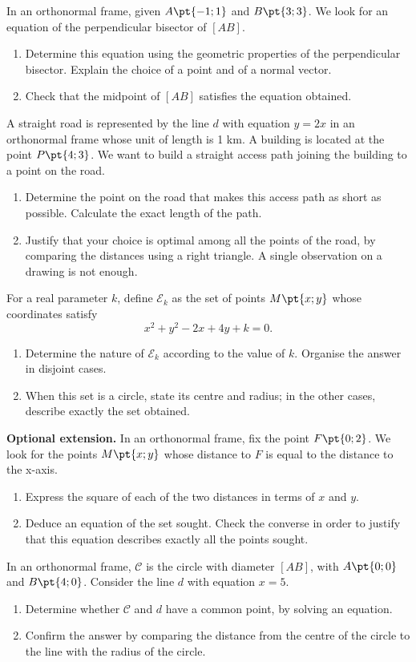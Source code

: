 In an orthonormal frame, given $A\pt{-1;1}$ and $B\pt{3;3}$. We look for an equation of the perpendicular bisector of $[AB]$.
\begin{enumerate}[label=\arabic*.]
\item Determine this equation using the geometric properties of the perpendicular bisector. Explain the choice of a point and of a normal vector.
\item Check that the midpoint of $[AB]$ satisfies the equation obtained.
\end{enumerate}
A straight road is represented by the line $d$ with equation $y=2x$ in an orthonormal frame whose unit of length is 1 km. A building is located at the point $P\pt{4;3}$. We want to build a straight access path joining the building to a point on the road.
\begin{enumerate}[label=\arabic*.]
\item Determine the point on the road that makes this access path as short as possible. Calculate the exact length of the path.
\item Justify that your choice is optimal among all the points of the road, by comparing the distances using a right triangle. A single observation on a drawing is not enough.
\end{enumerate}
For a real parameter $k$, define $\mathcal E_k$ as the set of points $M\pt{x;y}$ whose coordinates satisfy\[x^2+y^2-2x+4y+k=0.\]
\begin{enumerate}[label=\arabic*.]
\item Determine the nature of $\mathcal E_k$ according to the value of $k$. Organise the answer in disjoint cases.
\item When this set is a circle, state its centre and radius; in the other cases, describe exactly the set obtained.
\end{enumerate}
\textbf{Optional extension.} In an orthonormal frame, fix the point $F\pt{0;2}$. We look for the points $M\pt{x;y}$ whose distance to $F$ is equal to the distance to the x-axis.
\begin{enumerate}[label=\arabic*.]
\item Express the square of each of the two distances in terms of $x$ and $y$.
\item Deduce an equation of the set sought. Check the converse in order to justify that this equation describes exactly all the points sought.
\end{enumerate}
In an orthonormal frame, $\mathcal C$ is the circle with diameter $[AB]$, with $A\pt{0;0}$ and $B\pt{4;0}$. Consider the line $d$ with equation $x=5$.
\begin{enumerate}[label=\arabic*.]
\item Determine whether $\mathcal C$ and $d$ have a common point, by solving an equation.
\item Confirm the answer by comparing the distance from the centre of the circle to the line with the radius of the circle.
\end{enumerate}
